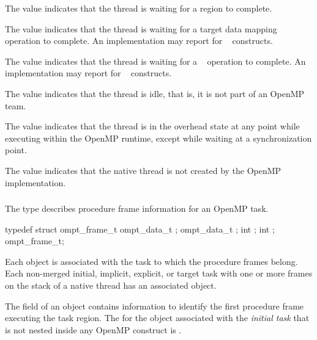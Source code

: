 The value  indicates that the thread is 
waiting for a  region to complete.

The value  indicates that the thread is 
waiting for a target data mapping operation to complete. An implementation may 
report  for ~ constructs.

The value  indicates that the thread is 
waiting for a ~ operation to complete. An implementation 
may report  for ~ constructs.

The value  indicates that the thread is idle, that  
is, it is not part of an OpenMP team.

The value  indicates that the thread is in the 
overhead state at any point while executing within the OpenMP runtime, 
except while waiting at a synchronization point.

The value  indicates that the native thread is 
not created by the OpenMP implementation.





\subsubsection{}
\label{sec:ompt_frame_t}
\label{subsubsubsec:ompt_frame_t}

\summary
The  type describes procedure frame information 
for an OpenMP task.

\format
\begin{ccppspecific}
\begin{ompSyntax}
typedef struct ompt_frame_t {
  ompt_data_t ;
  ompt_data_t ;
  int ;
  int ;
} ompt_frame_t;
\end{ompSyntax}
\end{ccppspecific}

\descr
Each  object is associated with the task to which 
the procedure frames belong. Each non-merged initial, implicit, explicit, 
or target task with one or more frames on the stack of a native thread 
has an associated  object.

The  field of an  object contains
information to identify the first procedure frame executing the task region.
The  for the  object associated with 
the \emph{initial task} that is not nested inside any OpenMP construct 
is .


